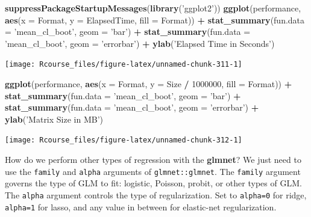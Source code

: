 \documentclass[]{book}
\newenvironment{Shaded}{\begin{snugshade}}{\end{snugshade}}
\newcommand{\KeywordTok}[1]{\textcolor[rgb]{0.13,0.29,0.53}{\textbf{#1}}}
\newcommand{\DataTypeTok}[1]{\textcolor[rgb]{0.13,0.29,0.53}{#1}}
\newcommand{\DecValTok}[1]{\textcolor[rgb]{0.00,0.00,0.81}{#1}}
\newcommand{\StringTok}[1]{\textcolor[rgb]{0.31,0.60,0.02}{#1}}
\newcommand{\OperatorTok}[1]{\textcolor[rgb]{0.81,0.36,0.00}{\textbf{#1}}}
\newcommand{\NormalTok}[1]{#1}
\theoremstyle{definition}
\theoremstyle{definition}
\theoremstyle{definition}
\theoremstyle{remark}
\begin{document}
\begin{Shaded}
\begin{Highlighting}[]
\KeywordTok{suppressPackageStartupMessages}\NormalTok{(}\KeywordTok{library}\NormalTok{(}\StringTok{'ggplot2'}\NormalTok{))}
\KeywordTok{ggplot}\NormalTok{(performance, }\KeywordTok{aes}\NormalTok{(}\DataTypeTok{x =}\NormalTok{ Format, }\DataTypeTok{y =}\NormalTok{ ElapsedTime, }\DataTypeTok{fill =}\NormalTok{ Format)) }\OperatorTok{+}
\StringTok{  }\KeywordTok{stat_summary}\NormalTok{(}\DataTypeTok{fun.data =} \StringTok{'mean_cl_boot'}\NormalTok{, }\DataTypeTok{geom =} \StringTok{'bar'}\NormalTok{) }\OperatorTok{+}
\StringTok{  }\KeywordTok{stat_summary}\NormalTok{(}\DataTypeTok{fun.data =} \StringTok{'mean_cl_boot'}\NormalTok{, }\DataTypeTok{geom =} \StringTok{'errorbar'}\NormalTok{) }\OperatorTok{+}
\StringTok{  }\KeywordTok{ylab}\NormalTok{(}\StringTok{'Elapsed Time in Seconds'}\NormalTok{) }
\end{Highlighting}
\end{Shaded}

\texttt{[image: Rcourse\_files/figure-latex/unnamed-chunk-311-1]}

\begin{Shaded}
\begin{Highlighting}[]
\KeywordTok{ggplot}\NormalTok{(performance, }\KeywordTok{aes}\NormalTok{(}\DataTypeTok{x =}\NormalTok{ Format, }\DataTypeTok{y =}\NormalTok{ Size }\OperatorTok{/}\StringTok{ }\DecValTok{1000000}\NormalTok{, }\DataTypeTok{fill =}\NormalTok{ Format)) }\OperatorTok{+}
\StringTok{  }\KeywordTok{stat_summary}\NormalTok{(}\DataTypeTok{fun.data =} \StringTok{'mean_cl_boot'}\NormalTok{, }\DataTypeTok{geom =} \StringTok{'bar'}\NormalTok{) }\OperatorTok{+}
\StringTok{  }\KeywordTok{stat_summary}\NormalTok{(}\DataTypeTok{fun.data =} \StringTok{'mean_cl_boot'}\NormalTok{, }\DataTypeTok{geom =} \StringTok{'errorbar'}\NormalTok{) }\OperatorTok{+}
\StringTok{  }\KeywordTok{ylab}\NormalTok{(}\StringTok{'Matrix Size in MB'}\NormalTok{) }
\end{Highlighting}
\end{Shaded}

\texttt{[image: Rcourse\_files/figure-latex/unnamed-chunk-312-1]}

How do we perform other types of regression with the \textbf{glmnet}? We
just need to use the \texttt{family} and \texttt{alpha} arguments of
\texttt{glmnet::glmnet}. The \texttt{family} argument governs the type
of GLM to fit: logistic, Poisson, probit, or other types of GLM. The
\texttt{alpha} argument controls the type of regularization. Set to
\texttt{alpha=0} for ridge, \texttt{alpha=1} for lasso, and any value in
between for elastic-net regularization.
\end{document}
